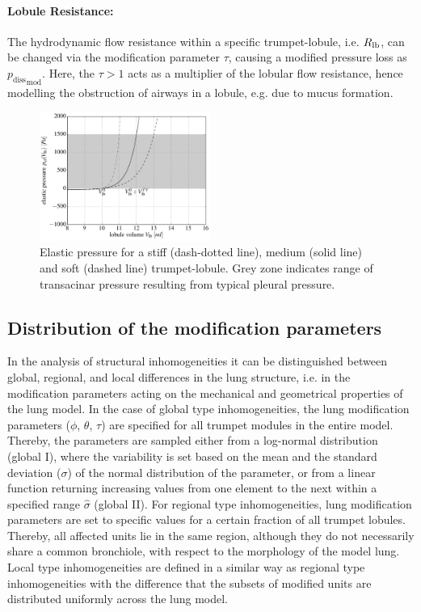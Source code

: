 \paragraph{Lobule Resistance: }
The hydrodynamic flow resistance within a specific trumpet-lobule, i.e. $R_{\mathrm{lb}}$, can be changed via the modification parameter $\tau$, causing a modified pressure loss as ${p_\mathrm{diss}}_\mathrm{mod}$.
Here, the $\tau>1$ acts as a multiplier of the lobular flow resistance, hence modelling the obstruction of airways in a lobule, e.g. due to mucus formation.
\begin{figure}[htb]
  \centering
  \includegraphics[width=0.5\textwidth]{figures/lobule_mechanics}
  \caption{Elastic pressure for a stiff (dash-dotted line), medium (solid line) and soft (dashed line) trumpet-lobule. Grey zone indicates range of transacinar pressure resulting from typical pleural pressure.}
  \label{fig:lobuleMechanics}
\end{figure}


\subsection{Distribution of the modification parameters}
In the analysis of structural inhomogeneities it can be distinguished between global, regional, and local differences in the lung structure, i.e. in the modification parameters acting on the mechanical and geometrical properties of the lung model.
In the case of global type inhomogeneities, the lung modification parameters ($\phi$, $\theta$, $\tau$) are specified for all trumpet modules in the entire model.
Thereby, the parameters are sampled either from a log-normal distribution (global I), where the variability is set based on the mean and the standard deviation ($\sigma$) of the normal distribution of the parameter, or from a linear function returning increasing values from one element to the next within a specified range $\hat\sigma$ (global II).
For regional type inhomogeneities, lung modification parameters are set to specific values for a certain fraction of all trumpet lobules.
Thereby, all affected units lie in the same region, although they do not necessarily share a common bronchiole, with respect to the morphology of the model lung.
Local type inhomogeneities are defined in a similar way as regional type inhomogeneities with the difference that the subsets of modified units are distributed uniformly across the lung model.



